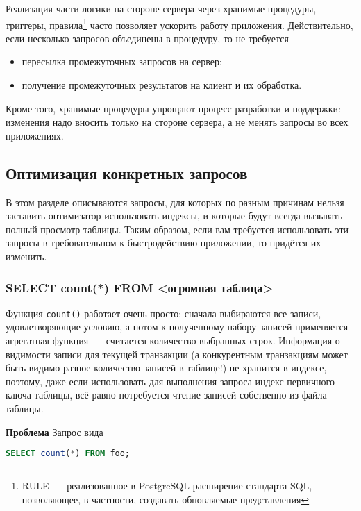 Реализация части логики на стороне сервера через хранимые процедуры, триггеры, правила\footnote{RULE~--- реализованное в PostgreSQL расширение стандарта SQL, позволяющее, в частности, создавать обновляемые представления} часто позволяет ускорить работу приложения. Действительно, если несколько запросов объединены в процедуру, то не требуется

\begin{itemize}
  \item пересылка промежуточных запросов на сервер;
  \item получение промежуточных результатов на клиент и их обработка.
\end{itemize}

Кроме того, хранимые процедуры упрощают процесс разработки и поддержки: изменения надо вносить только на стороне сервера, а не менять запросы во всех приложениях.

\subsection{Оптимизация конкретных запросов}
\label{sec:pg-optimize-sql}

В этом разделе описываются запросы, для которых по разным причинам нельзя заставить оптимизатор использовать индексы, и которые будут всегда вызывать полный просмотр таблицы. Таким образом, если вам требуется использовать эти запросы в требовательном к быстродействию приложении, то придётся их изменить.

\subsubsection{SELECT count(*) FROM <огромная таблица>}

Функция \lstinline!count()! работает очень просто: сначала выбираются все записи, удовлетворяющие условию, а потом к полученному набору записей применяется агрегатная функция~--- считается количество выбранных строк. Информация о видимости записи для текущей транзакции (а конкурентным транзакциям может быть видимо разное количество записей в таблице!) не хранится в индексе, поэтому, даже если использовать для выполнения запроса индекс первичного ключа таблицы, всё равно потребуется чтение записей собственно из файла таблицы.

\textbf{Проблема} Запрос вида

\begin{lstlisting}[language=SQL,label=lst:sql_performance1,caption=SQL]
SELECT count(*) FROM foo;
\end{lstlisting}

